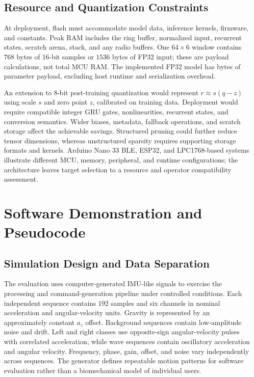 \documentclass[conference]{IEEEtran}
\begin{document}
\subsection{Resource and Quantization Constraints}
At deployment, flash must accommodate model data, inference kernels, firmware, and constants. Peak RAM includes the ring buffer, normalized input, recurrent states, scratch arena, stack, and any radio buffers. One $64\times6$ window contains $768$ bytes of 16-bit samples or $1536$ bytes of FP32 input; these are payload calculations, not total MCU RAM. The implemented FP32 model has \WeightBytes{} bytes of parameter payload, excluding host runtime and serialization overhead.

An extension to 8-bit post-training quantization would represent $r\approx s(q-z)$ using scale $s$ and zero point $z$, calibrated on training data. Deployment would require compatible integer GRU gates, nonlinearities, recurrent states, and conversion semantics. Wider biases, metadata, fallback operations, and scratch storage affect the achievable savings. Structured pruning could further reduce tensor dimensions, whereas unstructured sparsity requires supporting storage formats and kernels. Arduino Nano 33 BLE, ESP32, and LPC1768-based systems illustrate different MCU, memory, peripheral, and runtime configurations; the architecture leaves target selection to a resource and operator compatibility assessment.

\section{Software Demonstration and Pseudocode}
\subsection{Simulation Design and Data Separation}
The evaluation uses computer-generated IMU-like signals to exercise the processing and command-generation pipeline under controlled conditions. Each independent sequence contains $192$ samples and six channels in nominal acceleration and angular-velocity units. Gravity is represented by an approximately constant $a_z$ offset. Background sequences contain low-amplitude noise and drift. Left and right classes use opposite-sign angular-velocity pulses with correlated acceleration, while wave sequences contain oscillatory acceleration and angular velocity. Frequency, phase, gain, offset, and noise vary independently across sequences. The generator defines repeatable motion patterns for software evaluation rather than a biomechanical model of individual users.
\end{document}
